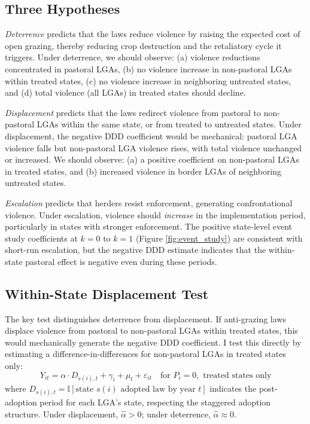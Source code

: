 \documentclass[12pt]{article}
\newcommand{\ind}{\mathbb{I}}
\begin{document}
\subsection{Three Hypotheses}

\textit{Deterrence} predicts that the laws reduce violence by raising the expected cost of open grazing, thereby reducing crop destruction and the retaliatory cycle it triggers. Under deterrence, we should observe: (a) violence reductions concentrated in pastoral LGAs, (b) no violence increase in non-pastoral LGAs within treated states, (c) no violence increase in neighboring untreated states, and (d) total violence (all LGAs) in treated states should decline.

\textit{Displacement} predicts that the laws redirect violence from pastoral to non-pastoral LGAs within the same state, or from treated to untreated states. Under displacement, the negative DDD coefficient would be mechanical: pastoral LGA violence falls but non-pastoral LGA violence rises, with total violence unchanged or increased. We should observe: (a) a positive coefficient on non-pastoral LGAs in treated states, and (b) increased violence in border LGAs of neighboring untreated states.

\textit{Escalation} predicts that herders resist enforcement, generating confrontational violence. Under escalation, violence should \textit{increase} in the implementation period, particularly in states with stronger enforcement. The positive state-level event study coefficients at $k = 0$ to $k = 1$ (Figure \ref{fig:event_study}) are consistent with short-run escalation, but the negative DDD estimate indicates that the within-state pastoral effect is negative even during these periods.

\subsection{Within-State Displacement Test}

The key test distinguishes deterrence from displacement. If anti-grazing laws displace violence from pastoral to non-pastoral LGAs within treated states, this would mechanically generate the negative DDD coefficient. I test this directly by estimating a difference-in-differences for non-pastoral LGAs in treated states only:
\begin{equation}
Y_{it} = \alpha \cdot D_{s(i),t} + \gamma_i + \mu_t + \varepsilon_{it} \quad \text{for } P_i = 0, \text{ treated states only}
\label{eq:displacement}
\end{equation}
where $D_{s(i),t} = \ind[\text{state } s(i) \text{ adopted law by year } t]$ indicates the post-adoption period for each LGA's state, respecting the staggered adoption structure. Under displacement, $\hat{\alpha} > 0$; under deterrence, $\hat{\alpha} \approx 0$.
\end{document}
